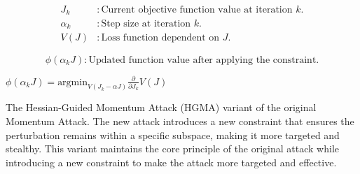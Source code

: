 \[
\begin{aligned}
J_k & : \text{Current objective function value at iteration } k. \\
\alpha_k & : \text{Step size at iteration } k. \\
V(J) & : \text{Loss function dependent on } J.
\end{aligned}
\]

\[
\phi(\alpha_k J) : \text{Updated function value after applying the constraint.}
\]

$\phi(\alpha_k J) = \text{argmin}_{V(J_k - \alpha J)} \frac{\partial}{\partial J_k} V(J)$

The Hessian-Guided Momentum Attack (HGMA) variant of the original Momentum Attack. The new attack introduces a new constraint that ensures the perturbation remains within a specific subspace, making it more targeted and stealthy. This variant maintains the core principle of the original attack while introducing a new constraint to make the attack more targeted and effective.